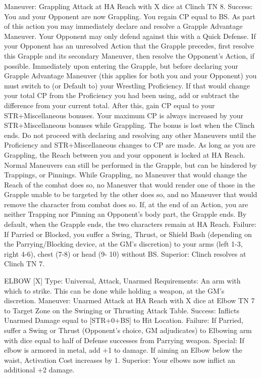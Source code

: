 \documentclass[oneside,11pt,english]{book}
\begin{document}
Maneuver: Grappling Attack at HA Reach with X dice at Clinch TN 8. 
Success: You and your Opponent are now Grappling. You regain CP equal to BS. As part of this action 
you may immediately declare and resolve a Grapple Advantage Maneuver. Your Opponent may only 
defend against this with a Quick Defense. If your Opponent has an unresolved Action that the Grapple 
precedes, first resolve this Grapple and its secondary Maneuver, then resolve the Opponent’s Action, if 
possible. 
Immediately upon entering the Grapple, but before declaring your Grapple Advantage Maneuver (this 
applies for both you and your Opponent) you must switch to (or Default to) your Wrestling Proficiency. If 
that would change your total CP from the Proficiency you had been using, add or subtract the difference 
from your current total. After this, gain CP equal to your STR+Miscellaneous bonuses. Your maximum 
CP is always increased by your STR+Miscellaneous bonuses while Grappling. The bonus is lost when the 
Clinch ends. 
Do not proceed with declaring and resolving any other Maneuvers until the Proficiency and 
STR+Miscellaneous changes to CP are made. 
As long as you are Grappling, the Reach between you and your opponent is locked at HA Reach. Normal 
Maneuvers can still be performed in the Grapple, but can be hindered by Trappings, or Pinnings. 
While Grappling, no Maneuver that would change the Reach of the combat does so, no Maneuver that 
would render one of those in the Grapple unable to be targeted by the other does so, and no Maneuver that 
would remove the character from combat does so. 
If, at the end of an Action, you are neither Trapping nor Pinning an Opponent's body part, the Grapple 
ends. By default, when the Grapple ends, the two characters remain at HA Reach. 
Failure: If Parried or Blocked, you suffer a Swing, Thrust, or Shield Bash (depending on the 
Parrying/Blocking device, at the GM's discretion) to your arms (left 1-3, right 4-6), chest (7-8) or head (9-
10) without BS. 
Superior: Clinch resolves at Clinch TN 7. 

 

ELBOW [X] 
Type: Universal, Attack, Unarmed 
Requirements: An arm with which to strike. This can be done while holding a weapon, at the GM's 
discretion. 
Maneuver: Unarmed Attack at HA Reach with X dice at Elbow TN 7 to Target Zone on the Swinging or 
Thrusting Attack Table. 
Success: Inflicts Unarmed Damage equal to [STR+0+BS] to Hit Location. 
Failure: If Parried, suffer a Swing or Thrust (Opponent’s choice, GM adjudicates) to Elbowing arm with 
dice equal to half of Defense successes from Parrying weapon. 
Special: If elbow is armored in metal, add +1 to damage. 
If aiming an Elbow below the waist, Activation Cost increases by 1. 
Superior: Your elbows now inflict an additional +2 damage. 
\end{document}
